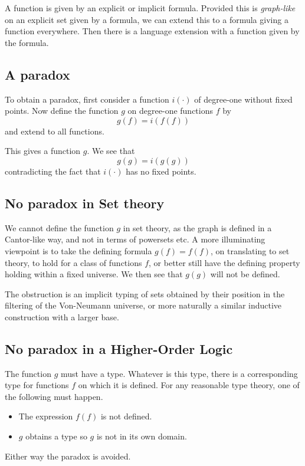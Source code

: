 \documentclass{amsart}
\begin{document}
A function is given by an explicit or implicit formula. Provided this is \emph{graph-like} on an explicit set given by a formula, we can extend this to a formula giving a function everywhere. Then there is a language extension with a function given by the formula. 

\subsection*{A paradox}

To obtain a paradox, first consider a function $i(\cdot)$ of degree-one without fixed points. Now define the function $g$ on degree-one functions $f$ by
$$g(f) = i(f(f))$$
and extend to all functions. 

This gives a function $g$. We see that
$$g(g)=i(g(g))$$
contradicting the fact that $i(\cdot)$ has no fixed points.

\subsection*{No paradox in Set theory}

We cannot define the function $g$ in set theory, as the graph is defined in a Cantor-like way, and not in terms of powersets etc. A more illuminating viewpoint is to take the defining formula $g(f)=f(f)$, on translating to set theory, to hold for a class of functions $f$, or better still have the defining property holding within a fixed universe. We then see that $g(g)$ will not be defined.

The obstruction is an implicit typing of sets obtained by their position in the filtering of the Von-Neumann universe, or more naturally a similar inductive construction with a larger base.

\subsection*{No paradox in a Higher-Order Logic}

The function $g$ must have a type. Whatever is this type, there is a corresponding type for functions $f$ on which it is defined. For any reasonable type theory, one of the following must happen.
\begin{itemize}
\item The expression $f(f)$ is not defined.
\item $g$ obtains a type so $g$ is not in its own domain.
\end{itemize}
Either way the paradox is avoided.
\end{document}
